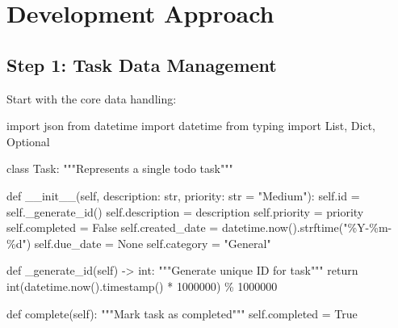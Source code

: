 \documentclass[
  letterpaper,
  DIV=11,
  numbers=noendperiod,
  oneside]{scrreprt}
\newenvironment{Shaded}{}{}
\newcommand{\BuiltInTok}[1]{\textcolor[rgb]{0.84,0.23,0.29}{#1}}
\newcommand{\CommentTok}[1]{\textcolor[rgb]{0.42,0.45,0.49}{#1}}
\newcommand{\ControlFlowTok}[1]{\textcolor[rgb]{0.84,0.23,0.29}{#1}}
\newcommand{\DecValTok}[1]{\textcolor[rgb]{0.00,0.36,0.77}{#1}}
\newcommand{\FunctionTok}[1]{\textcolor[rgb]{0.44,0.26,0.76}{#1}}
\newcommand{\ImportTok}[1]{\textcolor[rgb]{0.01,0.18,0.38}{#1}}
\newcommand{\KeywordTok}[1]{\textcolor[rgb]{0.84,0.23,0.29}{#1}}
\newcommand{\NormalTok}[1]{\textcolor[rgb]{0.14,0.16,0.18}{#1}}
\newcommand{\OperatorTok}[1]{\textcolor[rgb]{0.14,0.16,0.18}{#1}}
\newcommand{\SpecialCharTok}[1]{\textcolor[rgb]{0.00,0.36,0.77}{#1}}
\newcommand{\StringTok}[1]{\textcolor[rgb]{0.01,0.18,0.38}{#1}}
\newcommand{\VariableTok}[1]{\textcolor[rgb]{0.89,0.38,0.04}{#1}}
\begin{document}
\section{Development Approach}\label{development-approach-11}

\subsection{Step 1: Task Data
Management}\label{step-1-task-data-management}

Start with the core data handling:

\begin{Shaded}
\begin{Highlighting}[]
\ImportTok{import}\NormalTok{ json}
\ImportTok{from}\NormalTok{ datetime }\ImportTok{import}\NormalTok{ datetime}
\ImportTok{from}\NormalTok{ typing }\ImportTok{import}\NormalTok{ List, Dict, Optional}

\KeywordTok{class}\NormalTok{ Task:}
    \CommentTok{"""Represents a single todo task"""}
    
    \KeywordTok{def} \FunctionTok{\_\_init\_\_}\NormalTok{(}\VariableTok{self}\NormalTok{, description: }\BuiltInTok{str}\NormalTok{, priority: }\BuiltInTok{str} \OperatorTok{=} \StringTok{"Medium"}\NormalTok{):}
        \VariableTok{self}\NormalTok{.}\BuiltInTok{id} \OperatorTok{=} \VariableTok{self}\NormalTok{.\_generate\_id()}
        \VariableTok{self}\NormalTok{.description }\OperatorTok{=}\NormalTok{ description}
        \VariableTok{self}\NormalTok{.priority }\OperatorTok{=}\NormalTok{ priority}
        \VariableTok{self}\NormalTok{.completed }\OperatorTok{=} \VariableTok{False}
        \VariableTok{self}\NormalTok{.created\_date }\OperatorTok{=}\NormalTok{ datetime.now().strftime(}\StringTok{"\%Y{-}\%m{-}}\SpecialCharTok{\%d}\StringTok{"}\NormalTok{)}
        \VariableTok{self}\NormalTok{.due\_date }\OperatorTok{=} \VariableTok{None}
        \VariableTok{self}\NormalTok{.category }\OperatorTok{=} \StringTok{"General"}
    
    \KeywordTok{def}\NormalTok{ \_generate\_id(}\VariableTok{self}\NormalTok{) }\OperatorTok{{-}\textgreater{}} \BuiltInTok{int}\NormalTok{:}
        \CommentTok{"""Generate unique ID for task"""}
        \ControlFlowTok{return} \BuiltInTok{int}\NormalTok{(datetime.now().timestamp() }\OperatorTok{*} \DecValTok{1000000}\NormalTok{) }\OperatorTok{\%} \DecValTok{1000000}
    
    \KeywordTok{def}\NormalTok{ complete(}\VariableTok{self}\NormalTok{):}
        \CommentTok{"""Mark task as completed"""}
        \VariableTok{self}\NormalTok{.completed }\OperatorTok{=} \VariableTok{True}
    

\end{Highlighting}
\end{Shaded}
\end{document}
